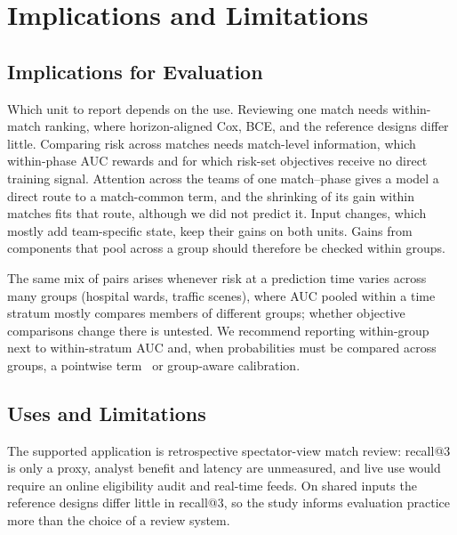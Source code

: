 \documentclass[sigconf,anonymous]{acmart}
\begin{document}
\section{Implications and Limitations}
\label{sec:discussion}
\subsection{Implications for Evaluation}
\label{sec:discussion:implications}
Which unit to report depends on the use. Reviewing one match needs within-match ranking, where horizon-aligned Cox, BCE, and the reference designs differ little. Comparing risk across matches needs match-level information, which within-phase AUC rewards and for which risk-set objectives receive no direct training signal. Attention across the teams of one match--phase gives a model a direct route to a match-common term, and the shrinking of its gain within matches fits that route, although we did not predict it. Input changes, which mostly add team-specific state, keep their gains on both units. Gains from components that pool across a group should therefore be checked within groups.

The same mix of pairs arises whenever risk at a prediction time varies across many groups (hospital wards, traffic scenes), where AUC pooled within a time stratum mostly compares members of different groups; whether objective comparisons change there is untested. We recommend reporting within-group next to within-stratum AUC and, when probabilities must be compared across groups, a pointwise term~\cite{Bai23} or group-aware calibration.

\subsection{Uses and Limitations}
\label{sec:discussion:limits}
The supported application is retrospective spectator-view match review: recall@3 is only a proxy, analyst benefit and latency are unmeasured, and live use would require an online eligibility audit and real-time feeds. On shared inputs the reference designs differ little in recall@3, so the study informs evaluation practice more than the choice of a review system.
\end{document}
